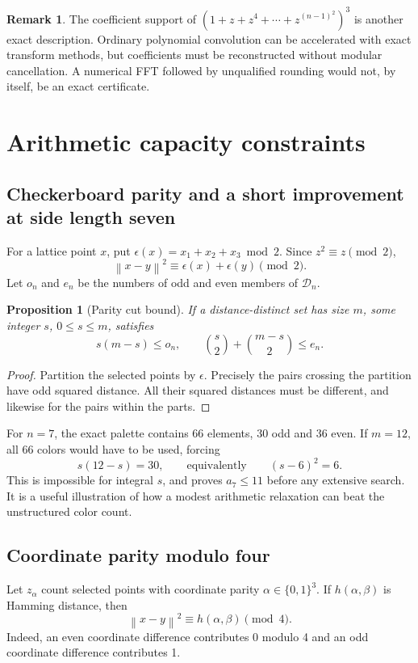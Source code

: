 \documentclass[11pt,letterpaper]{article}
\newtheorem{proposition}[theorem]{Proposition}
\theoremstyle{definition}
\newtheorem{remark}[theorem]{Remark}
\newcommand{\norm}[1]{\left\lVert #1\right\rVert}
\newcommand{\calD}{\mathcal D}
\begin{document}
\begin{remark}
The coefficient support of
\((1+z+z^4+\cdots+z^{(n-1)^2})^3\) is another exact description.
Ordinary polynomial convolution can be accelerated with exact transform
methods, but coefficients must be reconstructed without modular
cancellation. A numerical FFT followed by unqualified rounding would
not, by itself, be an exact certificate.
\end{remark}

\section{Arithmetic capacity constraints}
\label{sec:parity}

\subsection{Checkerboard parity and a short improvement at side length seven}
For a lattice point \(x\), put
\(\epsilon(x)=x_1+x_2+x_3\bmod2\).
Since \(z^2\equiv z\pmod2\),
\[
 \norm{x-y}^2\equiv \epsilon(x)+\epsilon(y)\pmod2.
\]
Let \(o_n\) and \(e_n\) be the numbers of odd and even members of
\(\calD_n\).

\begin{proposition}[Parity cut bound]
\label{prop:parity}
If a distance-distinct set has size \(m\), some integer \(s\), \(0\le s\le m\),
satisfies
\begin{equation}
 s(m-s)\le o_n,\qquad
 \binom{s}{2}+\binom{m-s}{2}\le e_n.
 \label{eq:parity-cut}
\end{equation}
\end{proposition}
\begin{proof}
Partition the selected points by \(\epsilon\). Precisely the pairs
crossing the partition have odd squared distance. All their squared
distances must be different, and likewise for the pairs within the parts.
\end{proof}

For \(n=7\), the exact palette contains 66 elements, 30 odd and 36 even.
If \(m=12\), all 66 colors would have to be used, forcing
\[
 s(12-s)=30,\qquad\text{equivalently}\qquad (s-6)^2=6.
\]
This is impossible for integral \(s\), and proves \(a_7\le11\) before
any extensive search. It is a useful illustration of how a modest
arithmetic relaxation can beat the unstructured color count.

\subsection{Coordinate parity modulo four}
Let \(z_\alpha\) count selected points with coordinate parity
\(\alpha\in\{0,1\}^3\). If \(h(\alpha,\beta)\) is Hamming distance,
then
\[
 \norm{x-y}^2\equiv h(\alpha,\beta)\pmod4.
\]
Indeed, an even coordinate difference contributes 0 modulo 4 and an
odd coordinate difference contributes 1.
\end{document}
